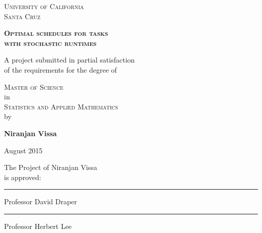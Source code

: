 \documentclass[12pt]{report}
\begin{document}
\begin{titlepage}
\begin{center}

\textsc{\Large University of California \\
Santa Cruz } \\
\vspace*{0.15in}

\textsc{\Large \textbf{Optimal schedules for tasks \\
with stochastic runtimes}}
\vspace*{0.15in}

\large
A project submitted in partial satisfaction \vspace*{-0.1in} \\
of the requirements for the degree of \\
\vspace*{0.15in}

\textsc{\Large Master of Science} \\
\large in \\

\textsc{\Large Statistics and Applied Mathematics} \\
\large by \\
\vspace*{0.15in}

\textbf{Niranjan Vissa} \\
\vspace*{0.15in}

August 2015
\large
\vspace*{0.15in}

\begin{flushright}

The Project of Niranjan Vissa \\
is approved:
\vspace*{-0.1in}
\vspace*{0.2in}

\rule{2.5in}{.01cm}

Professor David Draper

\vspace*{0.2in}

\rule{2.5in}{.01cm}

Professor Herbert Lee

\end{flushright}

\end{center}
\end{titlepage}


\end{document}
